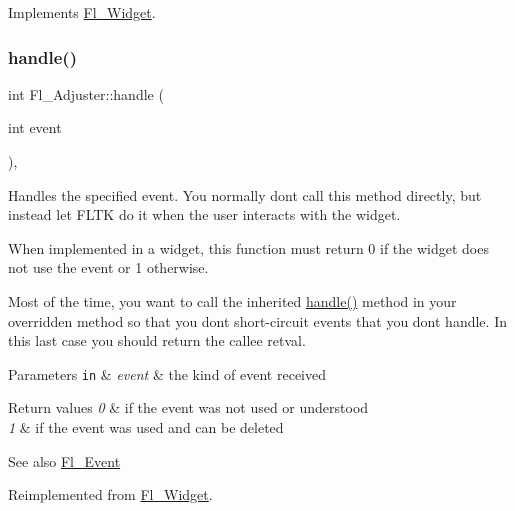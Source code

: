 Implements \hyperlink{class_fl___widget_a1acb38c6b3cb40452ad02ccfeedbac8a}{Fl\+\_\+\+Widget}.

\mbox{\label{class_fl___adjuster_a0626b220caa4b81261c61b89ab2f7409}} 
\subsubsection{\texorpdfstring{handle()}{handle()}}
{\footnotesize\ttfamily int Fl\+\_\+\+Adjuster\+::handle (\begin{DoxyParamCaption}\item[{int}]{event }\end{DoxyParamCaption})\hspace{0.3cm}{\ttfamily [protected]}, {\ttfamily [virtual]}}

Handles the specified event. You normally don\textquotesingle{}t call this method directly, but instead let F\+L\+TK do it when the user interacts with the widget.

When implemented in a widget, this function must return 0 if the widget does not use the event or 1 otherwise.

Most of the time, you want to call the inherited \hyperlink{class_fl___adjuster_a0626b220caa4b81261c61b89ab2f7409}{handle()} method in your overridden method so that you don\textquotesingle{}t short-\/circuit events that you don\textquotesingle{}t handle. In this last case you should return the callee retval.


\begin{DoxyParams}[1]{Parameters}
\mbox{\tt in}  & {\em event} & the kind of event received \\
\hline
\end{DoxyParams}

\begin{DoxyRetVals}{Return values}
{\em 0} & if the event was not used or understood \\
\hline
{\em 1} & if the event was used and can be deleted \\
\hline
\end{DoxyRetVals}
\begin{DoxySeeAlso}{See also}
\hyperlink{_enumerations_8_h_ad16daf120d9a0501cccaee563af0b9a3}{Fl\+\_\+\+Event} 
\end{DoxySeeAlso}


Reimplemented from \hyperlink{class_fl___widget_a3521aba25eda761620953dd49d335ea7}{Fl\+\_\+\+Widget}.

